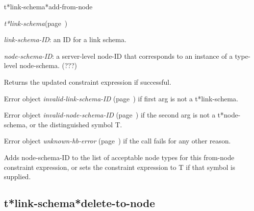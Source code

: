 \begin{description}
\item [Name:]  t*link-schema*add-from-node

\item [Class:] {\sl t*link-schema}\hfill(page~\pageref{t*link-schema})

\item [Parameters:]
\item {\sl link-schema-ID}:  an ID for a link schema.

\item {\sl node-schema-ID}:  a server-level node-ID that corresponds to an 
instance of a type-level node-schema. (???)



\item [Return-value:]
Returns the updated constraint expression if successful.

Error object {\sl invalid-link-schema-ID} (page~\pageref{invalid-link-schema-ID}) if first
arg is not a t*link-schema.

Error object {\sl invalid-node-schema-ID} (page~\pageref{invalid-node-schema-ID}) if the 
second arg is not a t*node-schema, or the distinguished
symbol T.

Error object {\sl unknown-hb-error} (page~\pageref{unknown-hb-error}) if the call fails
for any other reason. 

\item [Description:]

Adds node-schema-ID to the list of acceptable node
types for this from-node constraint expression, or 
sets the constraint expression to T if that symbol
is supplied.

\item [Public:]



\end{description}
\horizontalline

\subsection{t*link-schema*delete-to-node}
\label{t*link-schema*delete-to-node}

